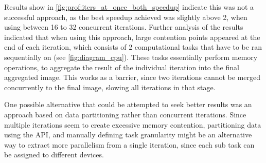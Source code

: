 \documentclass[main.tex]{subfiles}
\begin{document}

Results show in \cref{fig:prof:iters_at_once_both_speedup} indicate this was not a successful approach, as the best speedup achieved was slightly above 2, when using between 16 to 32 concurrent iterations. Further analysis of the results indicated that when using this approach, large contention points appeared at the end of each iteration, which consists of 2 computational tasks that have to be ran sequentially on \cpu (see \cref{fig:diagram_cpu}). These tasks essentially perform memory operations, to aggregate the result of the individual iteration into the final aggregated image. This works as a barrier, since two iterations cannot be merged concurrently to the final image, slowing all iterations in that stage.

One possible alternative that could be attempted to seek better results was an approach based on data partitioning rather than concurrent iterations. Since multiple iterations seem to create excessive memory contention, partitioning data using the \starpu API, and manually defining task granularity might be an alternative way to extract more parallelism from a single iteration, since each sub task can be assigned to different devices.
\end{document}

